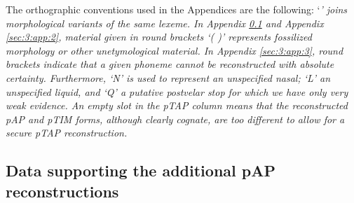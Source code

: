 \startappendix
The orthographic conventions used in the Appendices are the following: `\emph{\textup{{\Tilde}' joins morphological variants of the same lexeme. In Appendix \ref{sec:3:app:1} and Appendix \ref{sec:3:app:2}, material given in round brackets `( )' represents fossilized morphology or other unetymological material. In Appendix \ref{sec:3:app:3}, round brackets indicate that a given phoneme cannot be reconstructed with absolute certainty. Furthermore, `N' is used to represent an unspecified nasal; `L' an unspecified liquid, and `Q' a putative postvelar stop for which we have only very weak evidence. An empty slot in the pTAP column means that the reconstructed pAP and pTIM forms, although clearly cognate, are too different to allow for a secure pTAP reconstruction.} }
\subsection{Data supporting the additional pAP reconstructions}
 \label{sec:3:app:1}

